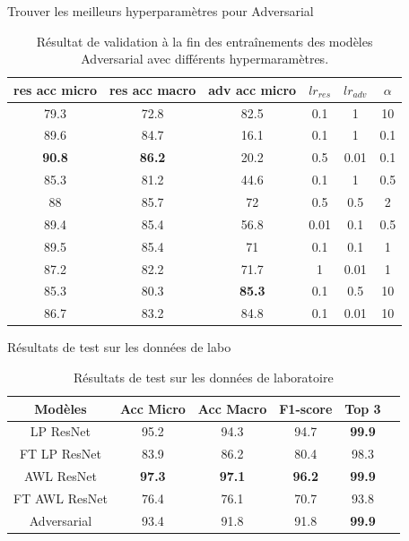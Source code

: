 \documentclass[11pt]{beamer}
\begin{document}
\begin{frame}{Trouver les meilleurs hyperparamètres pour Adversarial}
    \begin{table}[ht]
        \centering
        \begin{tabular}{cccccc}
        \toprule
        res acc micro & res acc macro & adv acc micro & $lr_{res}$ & $lr_{adv}$ & $\alpha$ \\
        \midrule
        79.3 & 72.8 & 82.5 & 0.1 & 1 & 10 \\
        89.6 & 84.7 & 16.1 & 0.1 & 1 & 0.1 \\
        \textbf{90.8} & \textbf{86.2} & 20.2 & 0.5 & 0.01 & 0.1 \\
        85.3 & 81.2 & 44.6 & 0.1 & 1 & 0.5 \\
        88 & 85.7 & 72 & 0.5 & 0.5 & 2 \\
        89.4 & 85.4 & 56.8 & 0.01 & 0.1 & 0.5 \\
        89.5 & 85.4 & 71 & 0.1 & 0.1 & 1 \\
        87.2 & 82.2 & 71.7 & 1 & 0.01 & 1 \\
        85.3 & 80.3 & \textbf{85.3} & 0.1 & 0.5 & 10 \\
        86.7 & 83.2 & 84.8 & 0.1 & 0.01 & 10 \\
        \bottomrule
        \end{tabular}
        \caption{Résultat de validation à la fin des entraînements des modèles Adversarial avec différents hypermaramètres.}
        \label{tab:random search results}
    \end{table}
\end{frame}

\begin{frame}{Résultats de test sur les données de labo}
    \begin{table}[ht]
      \centering
        \begin{tabular}{cccccc}
        \toprule
        Modèles & Acc Micro & Acc Macro & F1-score & Top 3 \\
        \midrule
        LP ResNet & 95.2 & 94.3 & 94.7 & \textbf{99.9} \\
        FT LP ResNet & 83.9 & 86.2 & 80.4 & 98.3 \\
        AWL ResNet & \textbf{97.3} & \textbf{97.1} & \textbf{96.2} & \textbf{99.9} \\
        FT AWL ResNet & 76.4 & 76.1 & 70.7 & 93.8 \\
        Adversarial & 93.4 & 91.8 & 91.8 & \textbf{99.9} \\
        \bottomrule
        \end{tabular}
        \caption{Résultats de test sur les données de laboratoire}
        \label{tab:results_lab}
    \end{table}
\end{frame}
\end{document}
